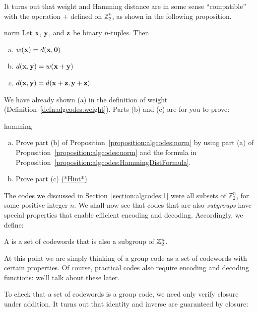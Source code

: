 It turns out that  weight and Hamming distance are in some sense ``compatible'' with the operation + defined on $\mathbb{Z}_2^n$, as shown in the following proposition.

\begin{prop}{norm}
Let ${\bold x}$, ${\bold y}$, and ${\bold z}$ be binary $n$-tuples. Then
\begin{enumerate}[(a)]
\item
$w({\bold x}) = d({\bold x},{\bold 0})$
\item
$d({\bold x},{\bold y}) = w({\bold x}+{\bold y})$
\item
$d({\bold x},{\bold y}) = d({\bold x}+{\bold z},{\bold y}+{\bold z})$
\end{enumerate}
\end{prop}
We have already shown (a) in the definition of weight (Definition~\ref{defn:algcodes:weight}).
Parts (b) and (c) are for you to prove:

\begin{exercise}{hamming}
\begin{enumerate}[(a)]
\item
Prove part (b) of Proposition~\ref{proposition:algcodes:norm} by using part (a) of Proposition~\ref{proposition:algcodes:norm} and the formula in Proposition~\ref{proposition:algcodes:HammingDistFormula}.
\item Prove part (c) \hyperref[sec:algcodes:hints]{(*Hint*)} 
\end{enumerate}
\end{exercise}
The codes we discussed in Section~\ref{section:algcodes:1} were all subsets of $\mathbb{Z}_2^n$, for some positive integer $n$. We shall now see that codes that are also \emph{subgroups} have special properties that enable efficient encoding and decoding. Accordingly, we define:

\begin{defn}
 A  is a set of codewords that is also a subgroup of ${\Bbb
Z}_2^n$.  
 \end{defn}

\begin{rem} At this point we are simply thinking of a group code as a set of codewords with certain properties. Of course, practical codes also require  encoding and decoding functions: we'll talk about these later.
\end{rem} 

 To check that a set of codewords is a group code, we need only verify closure under addition. It turns out that identity and inverse are guaranteed by closure:

